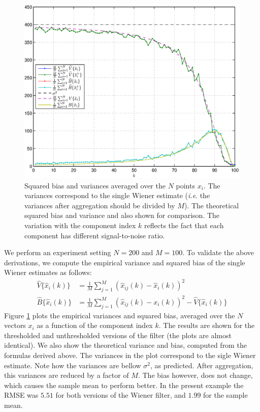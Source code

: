 \documentclass[a4paper,10pt]{article}
\newcommand{\ie}{\emph{i.e}. } \newcommand{\Ie}{\emph{I.e}. }
\begin{document}
\begin{figure}[htpb!]
	\centering
	\includegraphics[width=.9\textwidth]{variance-bias}
	\caption{Squared bias and variances averaged over the $N$ points $x_i$. The variances
	correspond to the single Wiener estimate (\ie the variances after aggregation should
	be divided by $M$). The theoretical squared bias and variance and also shown
	for comparison. The variation with the component index $k$ reflects the fact that 
	each component has different signal-to-noise ratio.}
	\label{fig:bias-variance}
\end{figure}

We perform an experiment setting $N = 200$ and $M = 100$. To validate the above
derivations, we compute the empirical variance and squared bias of the single Wiener
estimates as follows:
\begin{align*}
\widehat V\{\hat x_i(k)\} &= \frac1M \sum_{j=1}^M(\hat x_{ij}(k) - \hat x_i(k))^2\\
\widehat B\{\hat x_i(k)\} &= \frac1M \sum_{j=1}^M(\hat x_{ij}(k) - x_i(k))^2 - \widehat V\{\hat x_i(k)\}
\end{align*}
Figure \ref{fig:bias-variance} plots the empirical variances and squared bias,
averaged over the $N$ vectors $x_i$ as a function of the component index $k$.
The results are shown for the thresholded and unthresholded versions of the
filter (the plots are almost identical).
We also show the theoretical variance and bias, computed from the formulas
derived above.
The variances in the plot correspond to the sigle Wiener estimate. 
Note how the variances are bellow $\sigma^2$, as predicted.
After aggregation,
this variances are reduced by a factor of $M$.
The bias however, does not change, which causes the sample mean to perform better.
In the present example the RMSE was $5.51$ for both versions of the Wiener filter,
and $1.99$ for the sample mean.
\end{document}
